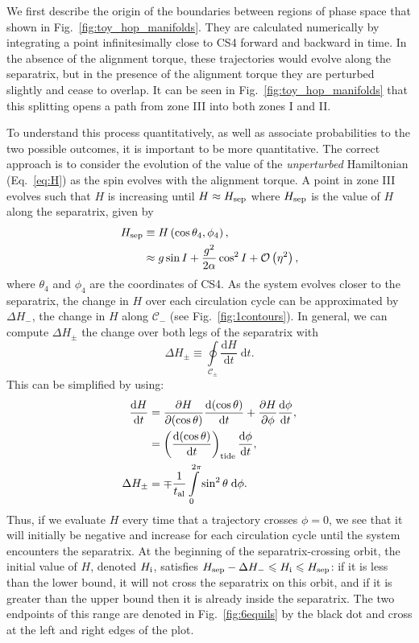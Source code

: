 \documentclass[
        fleqn,
        usenatbib,
    ]{mnras}
\newcommand*{\rd}[2]{\frac{\mathrm{d}#1}{\mathrm{d}#2}}
\newcommand*{\pd}[2]{\frac{\partial#1}{\partial#2}}
\newcommand*{\p}[1]{\left(#1\right)}
\begin{document}
We first describe the origin of the boundaries between regions of phase space
that shown in Fig.~\ref{fig:toy_hop_manifolds}. They are calculated numerically
by integrating a point infinitesimally close to CS4 forward and backward in
time. In the absence of the alignment torque, these trajectories would evolve
along the separatrix, but in the presence of the alignment torque they are
perturbed slightly and cease to overlap. It can be seen in
Fig.~\ref{fig:toy_hop_manifolds} that this splitting opens a path from zone III
into both zones I and II\@.

To understand this process quantitatively, as well as associate probabilities to
the two possible outcomes, it is important to be more quantitative. The correct
approach is to consider the evolution of the value of the \emph{unperturbed}
Hamiltonian (Eq.~\ref{eq:H}) as the spin evolves with the alignment torque. A
point in zone III evolves such that $H$ is increasing until $H \approx H_{\rm
sep}$ where $H_{\rm sep}$ is the value of $H$ along the separatrix, given by
\begin{align}
    H_{\rm sep} &\equiv H\p{\cos \theta_{\rm 4}, \phi_{\rm 4}},\nonumber\\
        &\approx g\sin I + \frac{g^2}{2\alpha}\cos^2 I +
            \mathcal{O}\p{\eta^2},\label{eq:def_Hsep}
\end{align}
where $\theta_4$ and $\phi_4$ are the coordinates of CS4. As the system evolves
closer to the separatrix, the change in $H$ over each circulation cycle can be
approximated by $\Delta H_-$, the change in $H$ along $\mathcal{C}_-$ (see
Fig.~\ref{fig:1contours}). In general, we can compute $\Delta H_{\pm}$ the
change over both legs of the separatrix with
\begin{equation}
    \Delta H_{\pm} \equiv \oint\limits_{\mathcal{C}_{\pm}}
        \rd{H}{t}\;\mathrm{d}t.\label{eq:def_dHpm}
\end{equation}
This can be simplified by using:
\begin{align}
    \rd{H}{t} &=
            \pd{H}{(\cos \theta)}\rd{(\cos \theta)}{t}
            + \pd{H}{\phi}\rd{\phi}{t},\nonumber\\
        &= \p{\rd{(\cos\theta)}{t}}_{\rm tide} \rd{\phi}{t},\\
    \Delta H_{\pm} &= \mp\frac{1}{t_{\rm al}}
        \int\limits_0^{2\pi} \sin^2\theta\;\mathrm{d}\phi.
\end{align}
Thus, if we evaluate $H$ every time that a trajectory crosses $\phi = 0$, we see
that it will initially be negative and increase for each circulation cycle until
the system encounters the separatrix. At the beginning of the
separatrix-crossing orbit, the initial value of $H$, denoted $H_{\rm i}$,
satisfies $H_{\rm sep} - \Delta H_- \leq H_{\rm i} \leq H_{\rm sep}$: if it is
less than the lower bound, it will not cross the separatrix on this orbit, and
if it is greater than the upper bound then it is already inside the separatrix.
The two endpoints of this range are denoted in Fig.~\ref{fig:6equils} by the
black dot and cross at the left and right edges of the plot.
\end{document}
